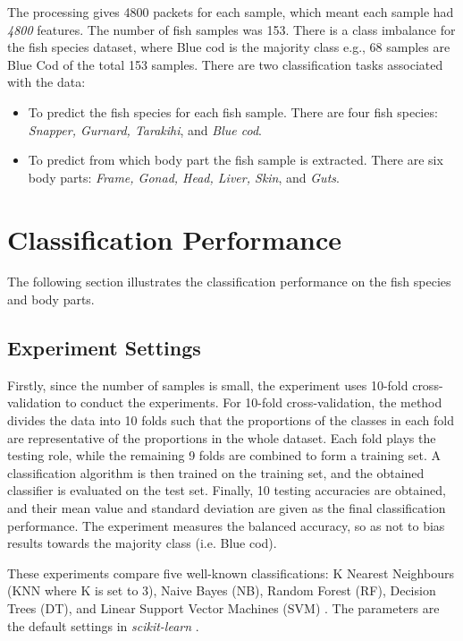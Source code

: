 \documentclass[runningheads]{llncs}
\begin{document}
The processing gives 4800 packets for each sample, which meant each sample had \textit{4800} features. 
The number of fish samples was 153. 
There is a class imbalance for the fish species dataset, where Blue cod is the majority class e.g., 68 samples are Blue Cod of the total 153 samples.
There are two classification tasks associated with the data:

\begin{itemize}
  \item To predict the fish species for each fish sample. There are four fish species: \textit{Snapper, Gurnard, Tarakihi}, and \textit{Blue cod}.
  \item To predict from which body part the fish sample is extracted. There are six body parts: \textit{Frame, Gonad, Head, Liver, Skin}, and \textit{Guts}.
\end{itemize}

\section{Classification Performance}

The following section illustrates the classification performance on the fish species and body parts.

\subsection{Experiment Settings}

Firstly, since the number of samples is small, the experiment uses 10-fold cross-validation to conduct the experiments. 
For 10-fold cross-validation, the method divides the data into 10 folds such that the proportions of the classes in each fold are representative of the proportions in the whole dataset. 
Each fold plays the testing role, while the remaining 9 folds are combined to form a training set. 
A classification algorithm is then trained on the training set, and the obtained classifier is evaluated on the test set. 
Finally, 10 testing accuracies are obtained, and their mean value and standard deviation are given as the final classification performance. 
The experiment measures the balanced accuracy, so as not to bias results towards the majority class (i.e. Blue cod).

These experiments compare five well-known classifications: K Nearest Neighbours (KNN where K is set to 3), Naive Bayes (NB), Random Forest (RF), Decision Trees (DT), and Linear Support Vector Machines (SVM)  \cite{fix1989discriminatory,hand2001idiot,ho1995random,loh2011classification,cortes1995support}. 
The parameters are the default settings in \textit{scikit-learn} \cite{pedregosa2011scikit}.
\end{document}
